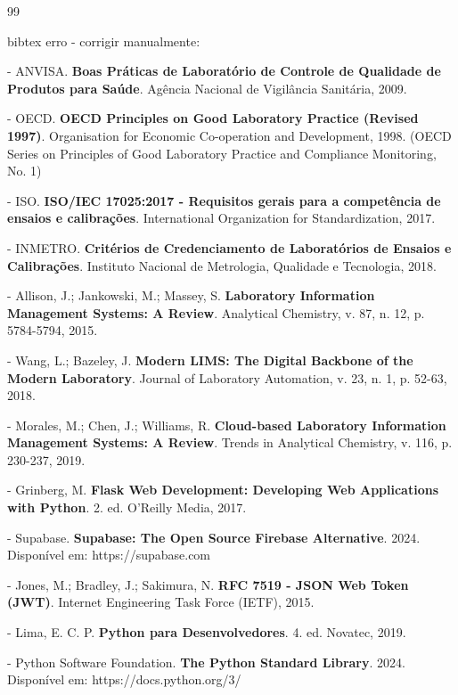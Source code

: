 \documentclass[12pt,a4paper]{article}
\providecommand\关键字[1]{\textbf{#1}}
\begin{document}
\begin{thebibliography}{99}


bibtex erro - corrigir manualmente:

- ANVISA. \textbf{Boas Práticas de Laboratório de Controle de Qualidade de Produtos para Saúde}. Agência Nacional de Vigilância Sanitária, 2009.

- OECD. \textbf{OECD Principles on Good Laboratory Practice (Revised 1997)}. Organisation for Economic Co-operation and Development, 1998. (OECD Series on Principles of Good Laboratory Practice and Compliance Monitoring, No. 1)

- ISO. \textbf{ISO/IEC 17025:2017 - Requisitos gerais para a competência de ensaios e calibrações}. International Organization for Standardization, 2017.

- INMETRO. \textbf{Critérios de Credenciamento de Laboratórios de Ensaios e Calibrações}. Instituto Nacional de Metrologia, Qualidade e Tecnologia, 2018.


- Allison, J.; Jankowski, M.; Massey, S. \textbf{Laboratory Information Management Systems: A Review}. Analytical Chemistry, v. 87, n. 12, p. 5784-5794, 2015.

- Wang, L.; Bazeley, J. \textbf{Modern LIMS: The Digital Backbone of the Modern Laboratory}. Journal of Laboratory Automation, v. 23, n. 1, p. 52-63, 2018.

- Morales, M.; Chen, J.; Williams, R. \textbf{Cloud-based Laboratory Information Management Systems: A Review}. Trends in Analytical Chemistry, v. 116, p. 230-237, 2019.


- Grinberg, M. \textbf{Flask Web Development: Developing Web Applications with Python}. 2. ed. O'Reilly Media, 2017.

- Supabase. \textbf{Supabase: The Open Source Firebase Alternative}. 2024. Disponível em: https://supabase.com

- Jones, M.; Bradley, J.; Sakimura, N. \textbf{RFC 7519 - JSON Web Token (JWT)}. Internet Engineering Task Force (IETF), 2015.

- Lima, E. C. P. \textbf{Python para Desenvolvedores}. 4. ed. Novatec, 2019.

- Python Software Foundation. \textbf{The Python Standard Library}. 2024. Disponível em: https://docs.python.org/3/


\end{thebibliography}
\end{document}
